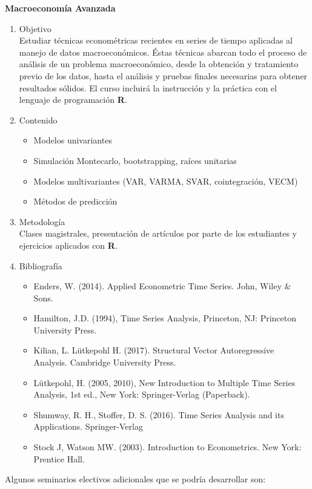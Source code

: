 \documentclass{article}\usepackage[]{graphicx}\usepackage[]{color}
\begin{document}
\textbf{Macroeconomía Avanzada}
\begin{enumerate}
  \item Objetivo\\
  Estudiar técnicas econométricas recientes en series de tiempo aplicadas al manejo de datos macroeconómicos. Éstas técnicas abarcan todo el proceso de análisis de un problema macroeconómico, desde la obtención y tratamiento previo de los datos, hasta el análisis y pruebas finales necesarias para obtener resultados sólidos. El curso incluirá la instrucción y la práctica con el lenguaje de programación \textbf{\textsf{R}}.
  \item Contenido
  \begin{itemize}
    \item Modelos univariantes
    \item Simulación Montecarlo, bootstrapping, raíces unitarias
    \item Modelos multivariantes (VAR, VARMA, SVAR, cointegración, VECM) 
    \item Métodos de predicción
  \end{itemize}
  \item Metodología\\
  Clases magistrales, presentación de artículos por parte de los estudiantes y ejercicios aplicados con \textbf{\textsf{R}}.
  \item Bibliografía
  \begin{itemize}
    \item Enders, W. (2014). Applied Econometric Time Series. John, Wiley \& Sons.
    \item Hamilton, J.D. (1994), Time Series Analysis, Princeton, NJ: Princeton University Press.
    \item Kilian, L. Lütkepohl H. (2017). Structural Vector Autoregressive Analysis. Cambridge University Press.
    \item Lütkepohl, H. (2005, 2010), New Introduction to Multiple Time Series Analysis, 1st ed., New York: Springer-Verlag (Paperback).
    \item Shumway, R. H., Stoffer, D. S. (2016). Time Series Analysis and its Applications. Springer-Verlag
    \item Stock J, Watson MW. (2003). Introduction to Econometrics. New York: Prentice Hall. 
  \end{itemize}
\end{enumerate}

Algunos seminarios electivos adicionales que se podría desarrollar son:
\end{document}
